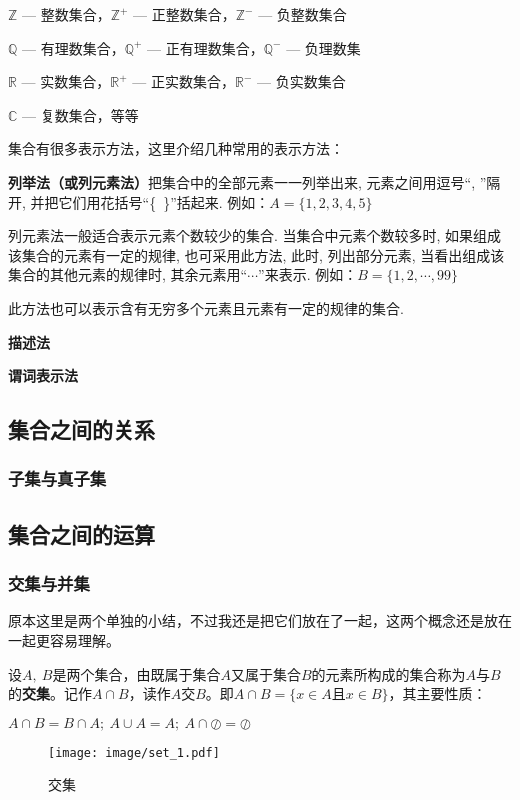 $\mathbb{Z}$ — 整数集合，$\mathbb{Z^+}$ — 正整数集合，$\mathbb{Z^-}$ — 负整数集合

$\mathbb{Q}$ — 有理数集合，$\mathbb{Q^+}$ — 正有理数集合，$\mathbb{Q^-}$ — 负理数集

$\mathbb{R}$ — 实数集合，$\mathbb{R^+}$ — 正实数集合，$\mathbb{R^-}$ — 负实数集合

$\mathbb{C}$ — 复数集合，等等

集合有很多表示方法，这里介绍几种常用的表示方法：

\textbf{列举法（或列元素法）}把集合中的全部元素一一列举出来, 元素之间用逗号“, ”隔开, 并把它们用花括号“\{~\}”括起来. 例如：$A=\{1,2,3,4,5\}$

列元素法一般适合表示元素个数较少的集合. 当集合中元素个数较多时, 如果组成该集合的元素有一定的规律, 也可采用此方法, 此时, 列出部分元素, 当看出组成该集合的其他元素的规律时, 其余元素用“$\cdots$”来表示. 例如：$B=\{1,2,\cdots{},99\}$

此方法也可以表示含有无穷多个元素且元素有一定的规律的集合.

\textbf{描述法}

\textbf{谓词表示法}

\subsection{集合之间的关系}

\subsubsection{子集与真子集}

\newpage
\subsection{集合之间的运算}

\subsubsection{交集与并集}

原本这里是两个单独的小结，不过我还是把它们放在了一起，这两个概念还是放在一起更容易理解。

设$A,~B$是两个集合，由既属于集合$A$又属于集合$B$的元素所构成的集合称为$A$与$B$的\textbf{交集}。记作$A\cap{}B$，读作$A$交$B$。即$A\cap{}B=\{x \in A \text{且} x \in B\}$，其主要性质：

$A\cap{}B=B\cap{}A;~A\cup{}A=A;~A\cap{}\oslash = \oslash$

\begin{figure}[ht]
     \flushright
     \texttt{[image: image/set\_1.pdf]}
     \captionsetup{justification=raggedleft,singlelinecheck=false}
     \caption{\small{交集}}
\end{figure}


